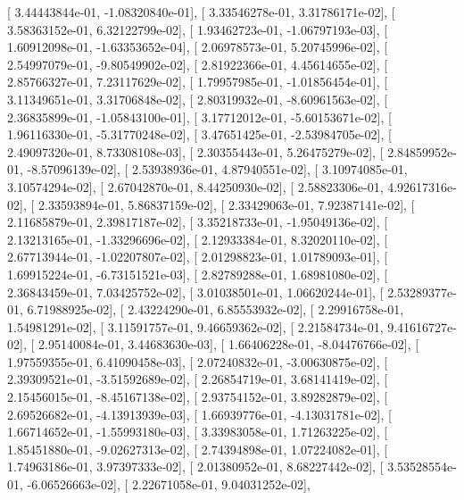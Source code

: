 \documentclass{article}
\begin{document}
       [  3.44443844e-01,  -1.08320840e-01],
       [  3.33546278e-01,   3.31786171e-02],
       [  3.58363152e-01,   6.32122799e-02],
       [  1.93462723e-01,  -1.06797193e-03],
       [  1.60912098e-01,  -1.63353652e-04],
       [  2.06978573e-01,   5.20745996e-02],
       [  2.54997079e-01,  -9.80549902e-02],
       [  2.81922366e-01,   4.45614655e-02],
       [  2.85766327e-01,   7.23117629e-02],
       [  1.79957985e-01,  -1.01856454e-01],
       [  3.11349651e-01,   3.31706848e-02],
       [  2.80319932e-01,  -8.60961563e-02],
       [  2.36835899e-01,  -1.05843100e-01],
       [  3.17712012e-01,  -5.60153671e-02],
       [  1.96116330e-01,  -5.31770248e-02],
       [  3.47651425e-01,  -2.53984705e-02],
       [  2.49097320e-01,   8.73308108e-03],
       [  2.30355443e-01,   5.26475279e-02],
       [  2.84859952e-01,  -8.57096139e-02],
       [  2.53938936e-01,   4.87940551e-02],
       [  3.10974085e-01,   3.10574294e-02],
       [  2.67042870e-01,   8.44250930e-02],
       [  2.58823306e-01,   4.92617316e-02],
       [  2.33593894e-01,   5.86837159e-02],
       [  2.33429063e-01,   7.92387141e-02],
       [  2.11685879e-01,   2.39817187e-02],
       [  3.35218733e-01,  -1.95049136e-02],
       [  2.13213165e-01,  -1.33296696e-02],
       [  2.12933384e-01,   8.32020110e-02],
       [  2.67713944e-01,  -1.02207807e-02],
       [  2.01298823e-01,   1.01789093e-01],
       [  1.69915224e-01,  -6.73151521e-03],
       [  2.82789288e-01,   1.68981080e-02],
       [  2.36843459e-01,   7.03425752e-02],
       [  3.01038501e-01,   1.06620244e-01],
       [  2.53289377e-01,   6.71988925e-02],
       [  2.43224290e-01,   6.85553932e-02],
       [  2.29916758e-01,   1.54981291e-02],
       [  3.11591757e-01,   9.46659362e-02],
       [  2.21584734e-01,   9.41616727e-02],
       [  2.95140084e-01,   3.44683630e-03],
       [  1.66406228e-01,  -8.04476766e-02],
       [  1.97559355e-01,   6.41090458e-03],
       [  2.07240832e-01,  -3.00630875e-02],
       [  2.39309521e-01,  -3.51592689e-02],
       [  2.26854719e-01,   3.68141419e-02],
       [  2.15456015e-01,  -8.45167138e-02],
       [  2.93754152e-01,   3.89282879e-02],
       [  2.69526682e-01,  -4.13913939e-03],
       [  1.66939776e-01,  -4.13031781e-02],
       [  1.66714652e-01,  -1.55993180e-03],
       [  3.33983058e-01,   1.71263225e-02],
       [  1.85451880e-01,  -9.02627313e-02],
       [  2.74394898e-01,   1.07224082e-01],
       [  1.74963186e-01,   3.97397333e-02],
       [  2.01380952e-01,   8.68227442e-02],
       [  3.53528554e-01,  -6.06526663e-02],
       [  2.22671058e-01,   9.04031252e-02],
\end{document}
